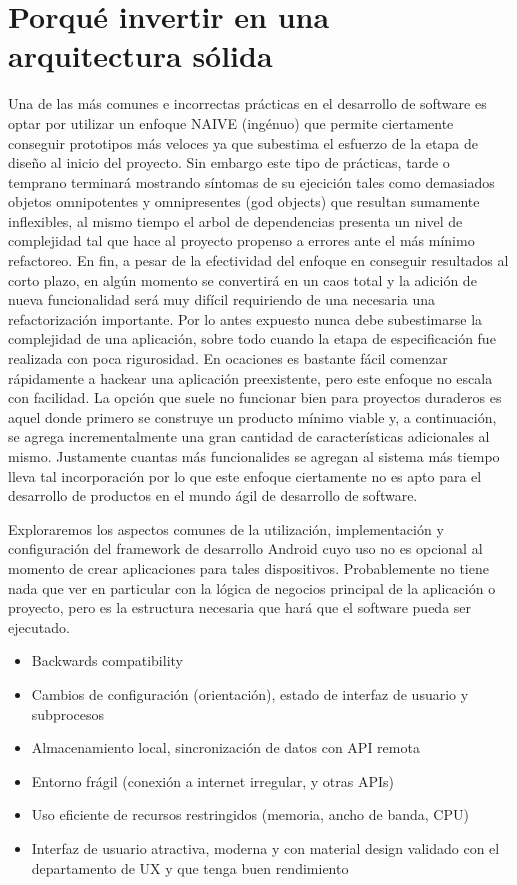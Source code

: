 \section{Porqué invertir en una arquitectura sólida}
Una de las más comunes e incorrectas prácticas en el desarrollo de software es optar por utilizar un enfoque NAIVE (ingénuo) que permite ciertamente conseguir prototipos más veloces ya que subestima el esfuerzo de la etapa de diseño al inicio del proyecto. Sin embargo este tipo de prácticas, tarde o temprano terminará mostrando síntomas de su ejecición tales como demasiados objetos omnipotentes y omnipresentes (god objects) que resultan sumamente inflexibles, al mismo tiempo el arbol de dependencias presenta un nivel de complejidad tal que hace al proyecto propenso a errores ante el más mínimo refactoreo. En fin, a pesar de la efectividad del enfoque en conseguir resultados al corto plazo, en algún momento se convertirá en un caos total y la adición de nueva funcionalidad será muy difícil requiriendo de una necesaria una refactorización importante. Por lo antes expuesto nunca debe subestimarse la complejidad de una aplicación, sobre todo cuando la etapa de especificación fue realizada con poca rigurosidad.
En ocaciones es bastante fácil comenzar rápidamente a hackear una aplicación preexistente, pero este enfoque no escala con facilidad. La opción que suele no funcionar bien para proyectos duraderos es aquel donde primero se construye un producto mínimo viable y, a continuación, se agrega incrementalmente una gran cantidad de características adicionales al mismo. Justamente cuantas más funcionalides se agregan al sistema más tiempo lleva tal incorporación por lo que este enfoque ciertamente no es apto para el desarrollo de productos en el mundo ágil de desarrollo de software.


Exploraremos los aspectos comunes de la utilización, implementación y configuración del framework de desarrollo Android cuyo uso no es opcional al momento de crear aplicaciones para tales dispositivos. Probablemente no tiene nada que ver en particular con la lógica de negocios principal de la aplicación o proyecto, pero es la estructura necesaria que hará que el software pueda ser ejecutado.

\begin{itemize}
	\item Backwards compatibility
	\item Cambios de configuración (orientación), estado de interfaz de usuario y subprocesos
	\item Almacenamiento local, sincronización de datos con API remota
	\item Entorno frágil (conexión a internet irregular, y otras APIs)
	\item Uso eficiente de recursos restringidos (memoria, ancho de banda, CPU)
	\item Interfaz de usuario atractiva, moderna y con material design  validado con el departamento de UX y que tenga buen rendimiento
	
\end{itemize}

